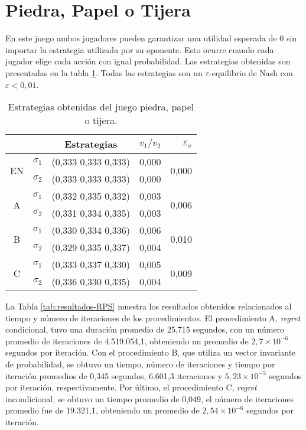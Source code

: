 \section*{Piedra, Papel o Tijera}

En este juego ambos jugadores pueden garantizar una utilidad esperada de $0$ sin importar la estrategia utilizada por su oponente. Esto ocurre cuando cada jugador elige cada acción con igual probabilidad. Las estrategias obtenidas son presentadas en la tabla \ref{tab:estrategias-RPS}. Todas las estrategias son un $\varepsilon$-equilibrio de Nash con $\varepsilon < 0,01$.

\begin{table}[h]
    \centering
    \caption{Estrategias obtenidas del juego piedra, papel o tijera.}
    \label{tab:estrategias-RPS}
    \begin{tabular}{c c c r r}
        \toprule
        & & Estrategias & $v_1 / v_2$ & $\varepsilon_{\sigma}$ \\
        \midrule
        \multirow{2}{*}{EN}
        & $\sigma_1$ & (0,333 0,333 0,333) & 0,000 & \multirow{2}{*}{0,000}\\
        & $\sigma_2$ & (0,333 0,333 0,333) & 0,000 & \\
        \hline
        \multirow{2}{*}{A}
        & $\sigma_1$ & (0,332 0,335 0,332) & 0,003 & \multirow{2}{*}{0,006}\\
        & $\sigma_2$ & (0,331 0,334 0,335) & 0,003 & \\
        \hline
        \multirow{2}{*}{B}
        & $\sigma_1$ & (0,330 0,334 0,336) & 0,006 & \multirow{2}{*}{0,010}\\
        & $\sigma_2$ & (0,329 0,335 0,337) & 0,004 & \\
        \hline
        \multirow{2}{*}{C}
        & $\sigma_1$ & (0,333 0,337 0,330) & 0,005 & \multirow{2}{*}{0,009} \\
        & $\sigma_2$ & (0,336 0,330 0,335) & 0,004 & \\
        \bottomrule
    \end{tabular}
\end{table}

La Tabla \ref{tab:resultados-RPS} muestra los resultados obtenidos relacionados al tiempo y número de iteraciones de los procedimientos. El procedimiento A, \textit{regret} condicional, tuvo una duración promedio de 25,715 segundos, con un número promedio de iteraciones de 4.519.054,1, obteniendo un promedio de $2,7 {\times} 10^{-6}$ segundos por iteración. Con el procedimiento B, que utiliza un vector invariante de probabilidad, se obtuvo un tiempo, número de iteraciones y tiempo por iteración promedios de 0,345 segundos, 6.601,3 iteraciones y $5,23 {\times} 10^{-5}$ segundos por iteración, respectivamente. Por último, el procedimiento C, \textit{regret} incondicional, se obtuvo un tiempo promedio de 0,049, el número de iteraciones promedio fue de 19.321,1, obteniendo un promedio de $2,54 {\times} 10^{-6}$ segundos por iteración.

